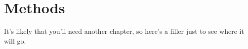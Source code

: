 \chapter{Methods}

It's likely that you'll need another chapter, so here's a filler just to see
where it will go. 